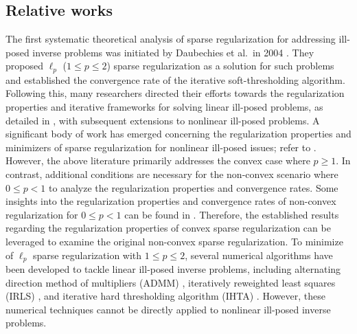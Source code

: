\documentclass[a4paper,12pt]{article}
\numberwithin{equation}{section}
\begin{document}
\subsection{Relative works}\label{sec1.1}

\par The first systematic theoretical analysis of sparse regularization for addressing ill-posed inverse problems was initiated by Daubechies et al.\ in 2004 \cite{DDD04}. They proposed $\ell_{p}$ ($1\leq p\leq 2$) sparse regularization as a solution for such problems and established the convergence rate of the iterative soft-thresholding algorithm. Following this, many researchers directed their efforts towards the regularization properties and iterative frameworks for solving linear ill-posed problems, as detailed in \cite{F10, SGGHL09}, with subsequent extensions to nonlinear ill-posed problems. A significant body of work has emerged concerning the regularization properties and minimizers of sparse regularization for nonlinear ill-posed issues; refer to \cite{JM12, RT05, RT06, TB10}. However, the above literature primarily addresses the convex case where $p\geq 1$. In contrast, additional conditions are necessary for the non-convex scenario where $0\leq p<1$ to analyze the regularization properties and convergence rates. Some insights into the regularization properties and convergence rates of non-convex regularization for $0\leq p<1$ can be found in \cite{G09, WLMC13, Z09}. Therefore, the established results regarding the regularization properties of convex sparse regularization can be leveraged to examine the original non-convex sparse regularization. To minimize of $\ell_{p}$ sparse regularization with $1\leq p\leq 2$, several numerical algorithms have been developed to tackle linear ill-posed inverse problems, including alternating direction method of multipliers (ADMM) \cite{WYZ19}, iteratively reweighted least squares (IRLS) \cite{XZWCL10}, and iterative hard thresholding algorithm (IHTA) \cite{BD09}. However, these numerical techniques cannot be directly applied to nonlinear ill-posed inverse problems.
\end{document}
